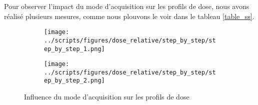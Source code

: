\documentclass{article}
\begin{document}
Pour observer l'impact du mode d'acquisition sur les profils de dose, nous avons réalisé plusieurs mesures, comme nous plouvons le voir dans le tableau \ref*{table_ss}.


\begin{figure}[h]
  \centering
  \begin{subfigure}{\textwidth}
    \centering
    \texttt{[image: ../scripts/figures/dose\_relative/step\_by\_step/step\_by\_step\_1.png]}
  \end{subfigure}
  \vspace{0.5cm}
  \begin{subfigure}{\textwidth}
    \centering
    \texttt{[image: ../scripts/figures/dose\_relative/step\_by\_step/step\_by\_step\_2.png]}
  \end{subfigure}
  \caption{Influence du mode d'acquisition sur les profils de dose}
  \label{fig_mode_acquisition}
\end{figure}
\end{document}
